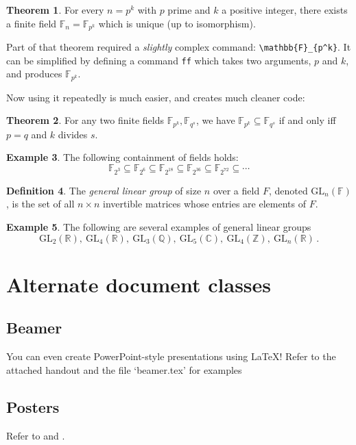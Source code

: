 \documentclass[11pt,letterpaper,titlepage]{article}
\numberwithin{equation}{section}
\numberwithin{figure}{section}
\numberwithin{table}{section}
\numberwithin{algorithm}{section}
\theoremstyle{definition}
\newtheorem{theorem}{Theorem}[section] %
\newtheorem{definition}[theorem]{Definition} %
\newtheorem{example}[theorem]{Example}
\newcommand{\ff}[2]{\mathbb{F}_{#1^{#2}}}
\newcommand{\gl}[2]{\mathrm{GL}_{#1}(\mathbb{#2})}
\begin{document}
    \begin{theorem}
    For every $n=p^k$ with $p$ prime and $k$ a positive integer, there exists a finite field $\mathbb{F}_n = \mathbb{F}_{p^k}$ which is unique (up to isomorphism).
    \end{theorem}
    
    Part of that theorem required a \textit{slightly} complex command: \verb$\mathbb{F}_{p^k}$. It can be simplified by defining a command \verb$ff$ which takes two arguments, $p$ and $k$, and produces $\ff{p}{k}$. 
    
    Now using it repeatedly is much easier, and creates much cleaner code:
    
    \begin{theorem}
    For any two finite fields $\ff{p}{k}, \ff{q}{s}$, we have $\ff{p}{k} \subseteq \ff{q}{s}$ if and only iff $p=q$ and $k$ divides $s$.
    \end{theorem}
    \begin{example}
    The following containment of fields holds:
    \[
    \ff{2}{3} \subseteq \ff{2}{6} \subseteq \ff{2}{18} \subseteq \ff{2}{36} \subseteq \ff{2}{72} \subseteq \cdots
    \]
    \end{example}
    
    \begin{definition}
    The \textit{general linear group} of size $n$ over a field $F$, denoted $\gl{n}{F}$, is the set of all $n\times n$ invertible matrices whose entries are elements of $F$.
    \end{definition}
    \begin{example}
    The following are several examples of general linear groups
    \[
    \gl{2}{R},\:\gl{4}{R},\:\gl{3}{Q},\:\gl{5}{C},\:\gl{4}{Z},\:\gl{n}{R}\,.
    \]
    \end{example}


\section{Alternate document classes}
    \subsection{Beamer}
        You can even create PowerPoint-style presentations using \LaTeX! Refer to the attached handout and the file `beamer.tex' for examples
 \subsection{Posters}
   Refer to \cite{posters} and \cite{posterexample}.
   
\end{document}
